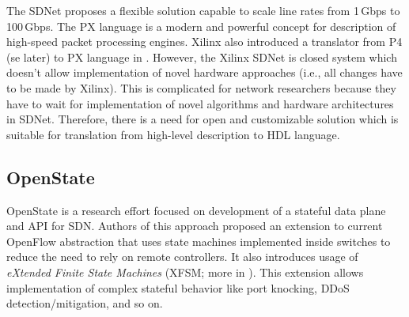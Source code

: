 The SDNet proposes a flexible solution capable to scale line rates from 1\,Gbps to 100\,Gbps. The PX language is a modern and powerful concept for 
description of high-speed packet processing engines. Xilinx also introduced a translator from P4 (se later) to PX language in \cite{XilinxP4toPX}. 
However, the Xilinx SDNet is closed system which doesn't allow implementation of novel hardware approaches 
(i.e., all changes have to be made by Xilinx). 
This is complicated for network researchers because they have to wait for implementation of novel algorithms and hardware architectures in SDNet. 
Therefore, there is a need for open and customizable solution which is suitable for translation from high-level description to HDL language.

\subsection{OpenState}
OpenState \cite{OpenStateSpec,BianchiOpenState,OpenStateGithub} is a research effort focused on development of a stateful data plane and API for SDN. 
Authors of this approach proposed an extension to current OpenFlow abstraction that uses state machines implemented inside switches to reduce 
the need to rely on remote controllers. It also introduces usage of \textit{eXtended Finite State Machines} 
(XFSM; more in \cite{BianchiWirelessMacProcessor,BianchiMaclets}). 
This extension allows implementation of complex stateful behavior like port knocking, DDoS detection/mitigation, and so on. 

